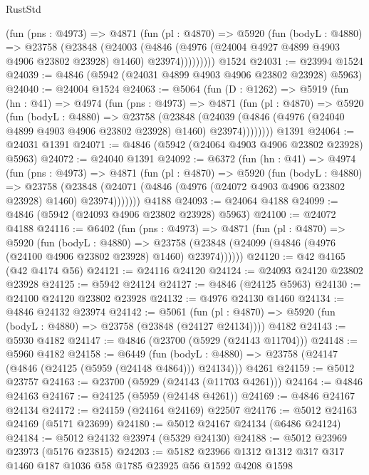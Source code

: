 \begin{lexlean}{RustStd}
\begin{coremodule}
          (fun (pns : @4973) =>
          @4871
            (fun (pl : @4870) =>
            @5920
              (fun (bodyL : @4880) =>
              @23758
                (@23848
                  (@24003
                    (@4846
                      (@4976 (@24004 @4927 @4899 @4903 @4906 @23802 @23928) @1460)
                      @23974)))))))))
    @1524
@24031 := @23994 @1524
@24039 := @4846 (@5942 (@24031 @4899 @4903 @4906 @23802 @23928) @5963)
@24040 := @24004 @1524
@24063 := @5064
    (fun (D : @1262) =>
    @5919
      (fun (hn : @41) =>
      @4974
        (fun (pns : @4973) =>
        @4871
          (fun (pl : @4870) =>
          @5920
            (fun (bodyL : @4880) =>
            @23758
              (@23848
                (@24039 (@4846 (@4976 (@24040 @4899 @4903 @4906 @23802 @23928) @1460) @23974))))))))
    @1391
@24064 := @24031 @1391
@24071 := @4846 (@5942 (@24064 @4903 @4906 @23802 @23928) @5963)
@24072 := @24040 @1391
@24092 := @6372
    (fun (hn : @41) =>
    @4974
      (fun (pns : @4973) =>
      @4871
        (fun (pl : @4870) =>
        @5920
          (fun (bodyL : @4880) =>
          @23758
            (@23848 (@24071 (@4846 (@4976 (@24072 @4903 @4906 @23802 @23928) @1460) @23974)))))))
    @4188
@24093 := @24064 @4188
@24099 := @4846 (@5942 (@24093 @4906 @23802 @23928) @5963)
@24100 := @24072 @4188
@24116 := @6402
    (fun (pns : @4973) =>
    @4871
      (fun (pl : @4870) =>
      @5920
        (fun (bodyL : @4880) =>
        @23758 (@23848 (@24099 (@4846 (@4976 (@24100 @4906 @23802 @23928) @1460) @23974))))))
@24120 := @42 @4165 (@42 @4174 @56)
@24121 := @24116 @24120
@24124 := @24093 @24120 @23802 @23928
@24125 := @5942 @24124
@24127 := @4846 (@24125 @5963)
@24130 := @24100 @24120 @23802 @23928
@24132 := @4976 @24130 @1460
@24134 := @4846 @24132 @23974
@24142 := @5061
    (fun (pl : @4870) => @5920 (fun (bodyL : @4880) => @23758 (@23848 (@24127 @24134))))
    @4182
@24143 := @5930 @4182
@24147 := @4846 (@23700 (@5929 (@24143 @11704)))
@24148 := @5960 @4182
@24158 := @6449
    (fun (bodyL : @4880) => @23758 (@24147 (@4846 (@24125 (@5959 (@24148 @4864))) @24134)))
    @4261
@24159 := @5012 @23757
@24163 := @23700 (@5929 (@24143 (@11703 @4261)))
@24164 := @4846 @24163
@24167 := @24125 (@5959 (@24148 @4261))
@24169 := @4846 @24167 @24134
@24172 := @24159 (@24164 @24169) @22507
@24176 := @5012 @24163 @24169 (@5171 @23699)
@24180 := @5012 @24167 @24134 (@6486 @24124)
@24184 := @5012 @24132 @23974 (@5329 @24130)
@24188 := @5012 @23969 @23973 (@5176 @23815)
@24203 := @5182 @23966 @1312 @1312 @317 @317 @1460 @187 @1036 @58 @1785 @23925 @56 @1592 @4208 @1598

\end{coremodule}
\end{lexlean}
